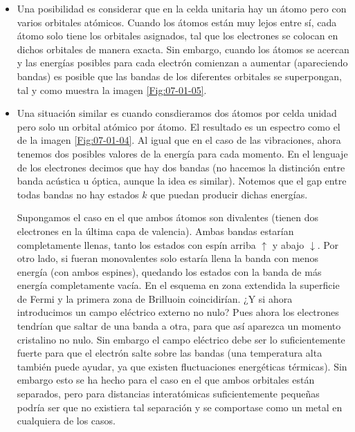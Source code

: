 \begin{itemize}
	\item Una posibilidad es considerar que en la celda unitaria hay un átomo pero con varios orbitales atómicos. Cuando los átomos están muy lejos entre sí, cada átomo solo tiene los orbitales asignados, tal que los electrones se colocan en dichos orbitales de manera exacta. Sin embargo, cuando los átomos se acercan y las energías posibles para cada electrón comienzan a aumentar (apareciendo bandas) es posible que las bandas de los diferentes orbitales se superpongan, tal y como muestra la imagen \ref{Fig:07-01-05}.
	\item Una situación similar es cuando consdieramos dos átomos por celda unidad pero solo un orbital atómico por átomo. El resultado es un espectro como el de la imagen \ref{Fig:07-01-04}. Al igual que en el caso de las vibraciones, ahora tenemos dos posibles valores de la energía para cada momento. En el lenguaje de los electrones decimos que hay dos bandas (no hacemos la distinción entre banda acústica u óptica, aunque la idea es similar). Notemos que el gap entre todas bandas no hay estados $k$ que puedan producir dichas energías.
	
	Supongamos el caso en el que ambos átomos son divalentes (tienen dos electrones en la última capa de valencia). Ambas bandas estarían completamente llenas, tanto los estados con espín arriba $\uparrow$ y abajo $\downarrow$. Por otro lado, si fueran monovalentes solo estaría llena la banda con menos energía (con ambos espines), quedando los estados con la banda de más energía completamente vacía. En el esquema en zona extendida la superficie de Fermi y la primera zona de Brilluoin coincidirían. ¿Y si ahora introducimos un campo eléctrico externo no nulo? Pues ahora los electrones tendrían que saltar de una banda a otra, para que así aparezca un momento cristalino no nulo. Sin embargo el campo eléctrico debe ser lo suficientemente fuerte para que el electrón salte sobre las bandas (una temperatura alta también puede ayudar, ya que existen fluctuaciones energéticas térmicas). Sin embargo esto se ha hecho para el caso en el que ambos orbitales están separados, pero para distancias interatómicas suficientemente pequeñas podría ser que no existiera tal separación y se comportase como un metal en cualquiera de los casos.
\end{itemize}


